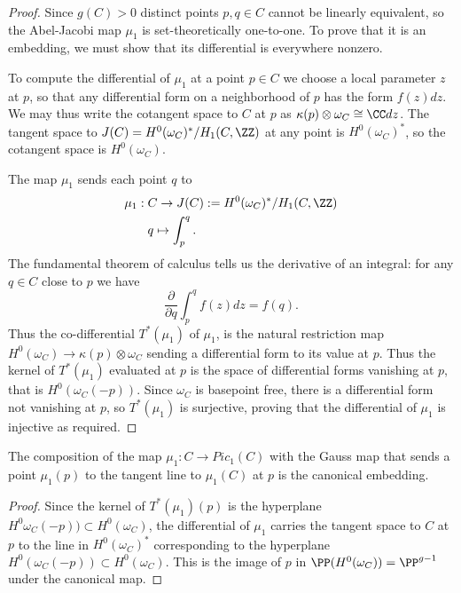 \begin{proof}
Since $g(C)>0$ distinct points $p, q \in C$ cannot be linearly equivalent, so the Abel-Jacobi map $\mu_1$ is set-theoretically one-to-one. To prove that it is an embedding, we must show that its differential is
everywhere nonzero.

To compute the differential of $\mu_1$ at a point $p\in C$ we choose a local parameter $z$ at $p$, so that  any differential form on a neighborhood of $p$ has the form $f(z)dz$. We may thus write the cotangent space to $C$ at $p$ as 
$\kappa(p) \otimes \omega_{C} \cong \CC dz$. The tangent space to $J(C) =  H^0(\omega_C)^*/H_1(C, \ZZ)$ at any point is $H^0(\omega_C)^*$, so the cotangent space is $H^0(\omega_C)$.

The map $\mu_{1}$ sends each point $q$ to
$$
\begin{aligned}
\mu_1 : \; &C \to J(C) := H^0(\omega_C)^*/H_1(C, \ZZ) \\
&q \mapsto \int_p^q .
\end{aligned}
$$
The fundamental theorem of calculus tells us the derivative of an integral: for any $q\in C$ close to $p$ we have
$$
\frac{\partial}{\partial q} \int_p^q f(z)dz = f(q).
$$
Thus the co-differential 
$T^*(\mu_1)$ of $\mu_1$, is the natural restriction map $H^0(\omega_{C}) \to \kappa(p) \otimes \omega_{C}$ sending
a differential form to its value at $p$. Thus the kernel of $T^*(\mu_1)$ evaluated at $p$ is the space of differential forms vanishing
at $p$, that is
$H^{0}(\omega_{C}(-p))$. Since $\omega_{C}$ is basepoint free, there is a differential form not vanishing at $p$,
so  $T^*(\mu_1)$ is surjective, proving that
the differential of $\mu_{1}$ is injective as required.
\end{proof}

\begin{corollary}
The composition of the map $\mu_{1}: C \to Pic_{1}(C)$ with the Gauss map that sends a point $\mu_{1}(p)$
to the tangent line to $\mu_{1}(C)$ at $p$ is the canonical embedding.
\end{corollary}

\begin{proof}
Since 
the kernel of $T^*(\mu_1)(p)$ is  the hyperplane $H^{0}\omega_{C}(-p))\subset H^{0}(\omega_{C})$, the differential 
of $\mu_{1}$ carries the tangent space to $C$ at $p$ to the line
in $H^0(\omega_C)^*$ corresponding to the hyperplane $H^0(\omega_C(-p))\subset H^0(\omega_C)$.
This is the image of $p$ in $\PP(H^{0}(\omega_{C})) = \PP^{g-1}$ under the
canonical map.
\end{proof}




